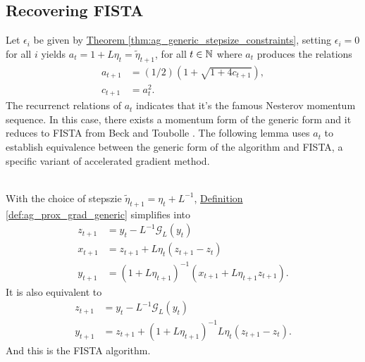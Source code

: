 \documentclass[12pt]{article}
\begin{document}
    \subsection{Recovering FISTA} 
        Let $\epsilon_i$ be given by
        \hyperref[thm:ag_generic_stepsize_constraints]
        {Theorem \ref*{thm:ag_generic_stepsize_constraints}}, 
        setting $\epsilon_i = 0$ for all $i$ yields $a_t = 1 + L\eta_t = \tilde \eta_{t + 1}$, for all $t \in \mathbb N$ where $a_t$ produces the relations 
        \begin{align*}
            a_{t + 1} &= (1/2)\left(
                1 + \sqrt{1 + 4 c_{t + 1}}
            \right), 
            \\
            c_{t + 1} &= a_t^2. 
        \end{align*}
        The recurrenct relations of $a_t$ indicates that it's the famous Nesterov momentum sequence. 
        In this case, there exists a momentum form of the generic form and it reduces to FISTA from Beck and Toubolle \cite{beck_fast_2009-1}. 
        The following lemma uses $a_t$ to establish equivalence between the generic form of the algorithm and FISTA, a specific variant of accelerated gradient method. 
        \begin{lemma}\label{lemma:sim_triangle_form}
            \quad \\
            With the choice of stepszie $\tilde \eta_{t + 1} = \eta_t + L^{-1}$,
            \hyperref[def:ag_prox_grad_generic]
            {Definition \ref*{def:ag_prox_grad_generic}}
            simplifies into 
            \begin{align*}
                z_{t + 1} &= y_t - L^{-1} \mathcal G_L(y_t)
                \\
                x_{t + 1} &= z_{t + 1} + L\eta_t (z_{t + 1} - z_t)
                \\
                y_{t + 1} &= 
                (1 + L\eta_{t + 1})^{-1}
                (
                x_{t + 1} + L\eta_{t + 1}z_{t + 1}
                ). 
            \end{align*}
            It is also equivalent to 
            \begin{align*}
                z_{t + 1} &= y_t - L^{-1}\mathcal G_L(y_t)
                \\
                y_{t + 1} &= z_{t + 1} + (1 + L\eta_{t + 1})^{-1}L\eta_t (z_{t + 1} - z_t). 
            \end{align*}
            And this is the FISTA algorithm. 
        \end{lemma}
\end{document}
